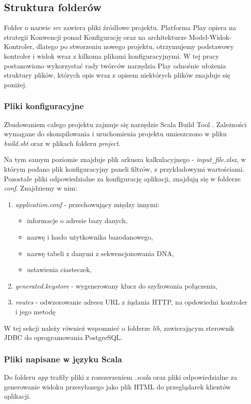 \documentclass[a4paper,12pt,twoside]{article}
\begin{document}
\subsection{Struktura folderów}
Folder o nazwie \textit{src} zawiera pliki źródłowe projektu.
Platforma Play opiera na strategii Konwencji ponad Konfigurację
oraz na architekturze Model-Widok-Kontroler, 
dlatego po stworzeniu nowego projektu, 
otrzymujemy podstawowy kontroler i widok wraz z kilkoma plikami konfiguracyjnymi.
W tej pracy postanowiono wykorzystać rady twórców narzędzia Play 
odnośnie ułożenia struktury plików, których opis wraz z opisem niektórych plików znajduje się poniżej.

\subsubsection{Pliki konfiguracyjne}
Zbudowaniem całego projektu zajmuje się narzędzie Scala Build Tool \cite{sbt}.
Zależności wymagane do skompilowania i uruchomienia projektu
umieszczono w pliku \textit{build.sbt} oraz w plikach folderu \textit{project}.

Na tym samym poziomie znajduje plik arkusza kalkulacyjnego - 
\textit{input}\verb!_!\textit{file.xlsx}, w którym podano plik konfiguracyjny paneli filtrów,
z przykładowymi wartościami.
Pozostałe pliki odpowiedzialne za konfigurację aplikacji, znajdują
się w folderze \textit{conf}. 
Znajdziemy w nim:
\begin{enumerate}[1)]
\item \textit{application.conf} - przechowujący między innymi:
\begin{itemize}
\item informacje o adresie bazy danych,
\item nazwę i hasło użytkownika bazodanowego,
\item nazwę tabeli z danymi z sekwencjonowania DNA,
\item ustawienia ciasteczek,
\end{itemize}
\item \textit{generated.keystore} - wygenerowany klucz do szyfrowania połączenia,
\item \textit{routes} - odwzorowanie adresu URL z żądania HTTP, na opdowiedni kontroler 
i jego  metodę 
\end{enumerate}

W tej sekcji należy również wspomnieć o folderze \textit{lib}, zawierającym
sterownik JDBC do oprogramowania PostgreSQL.

\newpage
\subsubsection{Pliki napisane w języku Scala}
Do folderu \textit{app} trafiły pliki z rozszerzeniem \textit{.scala} oraz pliki
odpowiedzialne za generowanie widoku przesyłanego jako plik HTML do
przeglądarek klientów aplikacji.
\end{document}
